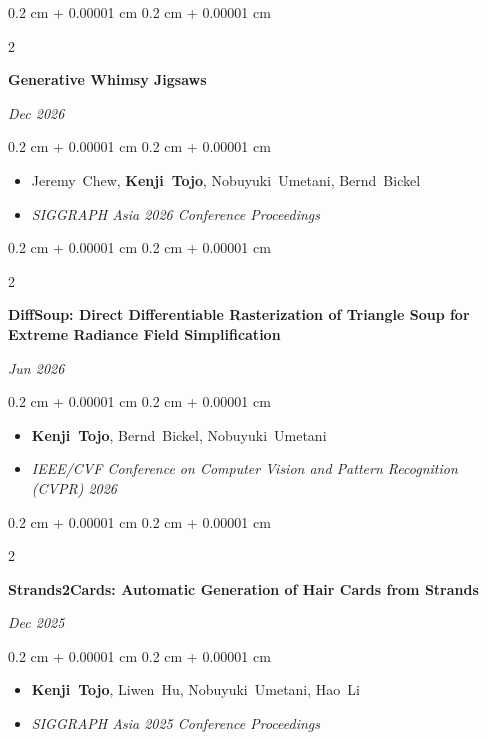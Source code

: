 \documentclass[10pt, letterpaper]{article}
\newenvironment{highlights}{
    \begin{itemize}[
        topsep=0.10 cm,
        parsep=0.10 cm,
        partopsep=0pt,
        itemsep=0pt,
        leftmargin=0.4 cm + 10pt
    ]
}{
    \end{itemize}
} %
\newenvironment{onecolentry}{
    \begin{adjustwidth}{
        0.2 cm + 0.00001 cm
    }{
        0.2 cm + 0.00001 cm
    }
}{
    \end{adjustwidth}
} %
\newenvironment{shorttwocolentry}[2][]{
    \onecolentry
    \def\secondColumn{#2}
    \setcolumnwidth{\fill, 2.5 cm}
    \begin{paracol}{2}
}{
    \switchcolumn \raggedleft \secondColumn
    \end{paracol}
    \endonecolentry
} %
\begin{document}
        \vspace{0.20 cm}
        \begin{samepage}
            \begin{shorttwocolentry}{\textit{Dec 2026}}
                \textbf{Generative Whimsy Jigsaws}
            \end{shorttwocolentry}
            \vspace{0.10 cm}
            \begin{onecolentry}
                \begin{highlights}
                    \item \mbox{Jeremy Chew}, \mbox{\textbf{Kenji Tojo}}, \mbox{Nobuyuki Umetani}, \mbox{Bernd Bickel}
                    \item \textit{SIGGRAPH Asia 2026 Conference Proceedings}
                \end{highlights}
            \end{onecolentry}
        \end{samepage}

        \vspace{0.20 cm}
        \begin{samepage}
            \begin{shorttwocolentry}{\textit{Jun 2026}}
                \textbf{DiffSoup: Direct Differentiable Rasterization of Triangle Soup for Extreme Radiance Field Simplification}
            \end{shorttwocolentry}
            \vspace{0.10 cm}
            \begin{onecolentry}
                \begin{highlights}
                    \item \mbox{\textbf{Kenji Tojo}}, \mbox{Bernd Bickel}, \mbox{Nobuyuki Umetani}
                    \item \textit{IEEE/CVF Conference on Computer Vision and Pattern Recognition (CVPR) 2026}
                \end{highlights}
            \end{onecolentry}
        \end{samepage}

        \vspace{0.20 cm}
        \begin{samepage}
            \begin{shorttwocolentry}{\textit{Dec 2025}}
                \textbf{Strands2Cards: Automatic Generation of Hair Cards from Strands}
            \end{shorttwocolentry}
            \vspace{0.10 cm}
            \begin{onecolentry}
                \begin{highlights}
                    \item \mbox{\textbf{Kenji Tojo}}, \mbox{Liwen Hu}, \mbox{Nobuyuki Umetani}, \mbox{Hao Li}
                    \item \textit{SIGGRAPH Asia 2025 Conference Proceedings}
                \end{highlights}
            \end{onecolentry}
        \end{samepage}
\end{document}
